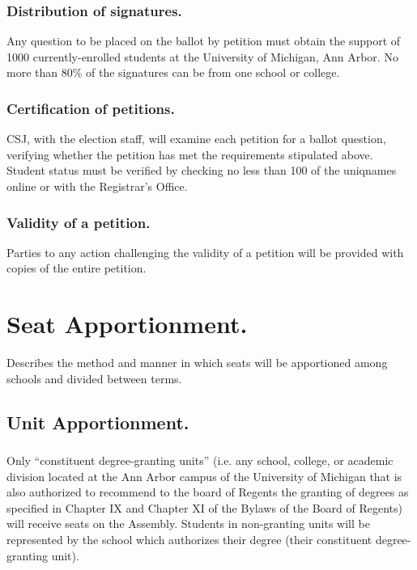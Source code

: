 \subsubsection{Distribution of signatures.}
Any question to be placed on the ballot by petition must obtain the support of 1000 currently-enrolled students at the University of Michigan, Ann Arbor.  No more than 80\% of the signatures can be from one school or college.

\subsubsection{Certification of petitions.}
CSJ, with the election staff, will examine each petition for a ballot question, verifying whether the petition has met the requirements stipulated above.  Student status must be verified by checking no less than 100 of the uniqnames online or with the Registrar's Office.

\subsubsection{Validity of a petition.}
Parties to any action challenging the validity of a petition will be provided with copies of the entire petition.


\section{Seat Apportionment.}
Describes the method and manner in which seats will be apportioned among schools and divided between terms.

\subsection{Unit Apportionment.}

\subsubsection{}
Only ``constituent degree-granting units'' (i.e. any school, college, or academic division located at the Ann Arbor campus of the University of Michigan that is also authorized to recommend to the board of Regents the granting of degrees as specified in Chapter IX and Chapter XI of the Bylaws of the Board of Regents) will receive seats on the Assembly.  Students in non-granting units will be represented by the school which authorizes their degree (their constituent degree-granting unit).


